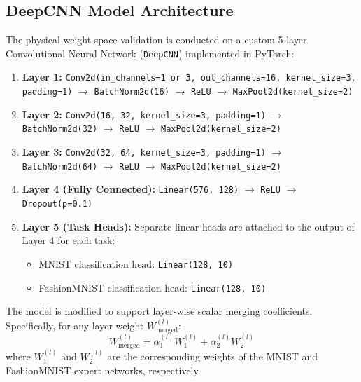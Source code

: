 \subsection{DeepCNN Model Architecture}
The physical weight-space validation is conducted on a custom 5-layer Convolutional Neural Network (\texttt{DeepCNN}) implemented in PyTorch:
\begin{enumerate}
    \item \textbf{Layer 1:} \texttt{Conv2d(in\_channels=1 or 3, out\_channels=16, kernel\_size=3, padding=1)} $\rightarrow$ \texttt{BatchNorm2d(16)} $\rightarrow$ \texttt{ReLU} $\rightarrow$ \texttt{MaxPool2d(kernel\_size=2)}
    \item \textbf{Layer 2:} \texttt{Conv2d(16, 32, kernel\_size=3, padding=1)} $\rightarrow$ \texttt{BatchNorm2d(32)} $\rightarrow$ \texttt{ReLU} $\rightarrow$ \texttt{MaxPool2d(kernel\_size=2)}
    \item \textbf{Layer 3:} \texttt{Conv2d(32, 64, kernel\_size=3, padding=1)} $\rightarrow$ \texttt{BatchNorm2d(64)} $\rightarrow$ \texttt{ReLU} $\rightarrow$ \texttt{MaxPool2d(kernel\_size=2)}
    \item \textbf{Layer 4 (Fully Connected):} \texttt{Linear(576, 128)} $\rightarrow$ \texttt{ReLU} $\rightarrow$ \texttt{Dropout(p=0.1)}
    \item \textbf{Layer 5 (Task Heads):} Separate linear heads are attached to the output of Layer 4 for each task:
    \begin{itemize}
        \item MNIST classification head: \texttt{Linear(128, 10)}
        \item FashionMNIST classification head: \texttt{Linear(128, 10)}
    \end{itemize}
\end{enumerate}
The model is modified to support layer-wise scalar merging coefficients.
Specifically, for any layer weight $W^{(l)}_{\text{merged}}$:
\begin{equation}
W^{(l)}_{\text{merged}} = \alpha^{(l)}_1 W^{(l)}_1 + \alpha^{(l)}_2 W^{(l)}_2
\end{equation}
where $W^{(l)}_1$ and $W^{(l)}_2$ are the corresponding weights of the MNIST and FashionMNIST expert networks, respectively.

